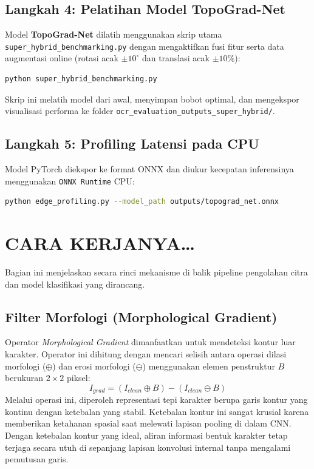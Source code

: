 \documentclass[12pt,a4paper]{article}
\begin{document}
\subsection*{Langkah 4: Pelatihan Model TopoGrad-Net}
Model \textbf{TopoGrad-Net} dilatih menggunakan skrip utama \texttt{super\_hybrid\_benchmarking.py} dengan mengaktifkan fusi fitur serta data augmentasi online (rotasi acak $\pm 10^\circ$ dan translasi acak $\pm 10\%$):
\begin{lstlisting}[language=bash]
python super_hybrid_benchmarking.py
\end{lstlisting}
Skrip ini melatih model dari awal, menyimpan bobot optimal, dan mengekspor visualisasi performa ke folder \texttt{ocr\_evaluation\_outputs\_super\_hybrid/}.

\subsection*{Langkah 5: Profiling Latensi pada CPU}
Model PyTorch diekspor ke format ONNX dan diukur kecepatan inferensinya menggunakan \texttt{ONNX Runtime} CPU:
\begin{lstlisting}[language=bash]
python edge_profiling.py --model_path outputs/topograd_net.onnx
\end{lstlisting}

\section*{CARA KERJANYA…}
Bagian ini menjelaskan secara rinci mekanisme di balik pipeline pengolahan citra dan model klasifikasi yang dirancang.

\subsection*{Filter Morfologi (Morphological Gradient)}
Operator \textit{Morphological Gradient} dimanfaatkan untuk mendeteksi kontur luar karakter. Operator ini dihitung dengan mencari selisih antara operasi dilasi morfologi ($\oplus$) dan erosi morfologi ($\ominus$) menggunakan elemen penstruktur $B$ berukuran $2 \times 2$ piksel:
\begin{equation}
    I_{grad} = (I_{clean} \oplus B) - (I_{clean} \ominus B)
\end{equation}
Melalui operasi ini, diperoleh representasi tepi karakter berupa garis kontur yang kontinu dengan ketebalan yang stabil. Ketebalan kontur ini sangat krusial karena memberikan ketahanan spasial saat melewati lapisan pooling di dalam CNN. Dengan ketebalan kontur yang ideal, aliran informasi bentuk karakter tetap terjaga secara utuh di sepanjang lapisan konvolusi internal tanpa mengalami pemutusan garis.
\end{document}
